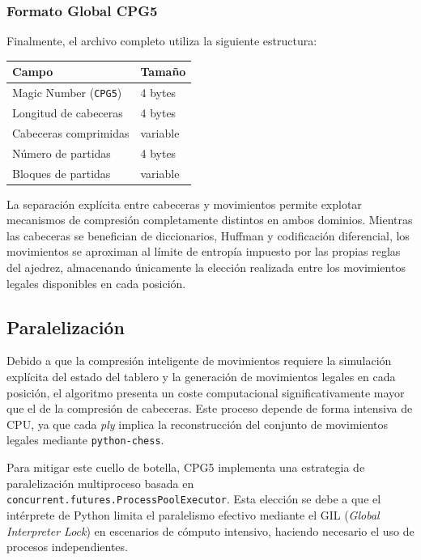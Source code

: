 \documentclass[11pt, letterpaper]{article}
\begin{document}
\subsubsection{Formato Global CPG5}

Finalmente, el archivo completo utiliza la siguiente estructura:

\begin{center}
\begin{tabular}{ll}
\hline
Campo & Tamaño \\
\hline
Magic Number (\texttt{CPG5}) & 4 bytes \\
Longitud de cabeceras & 4 bytes \\
Cabeceras comprimidas & variable \\
Número de partidas & 4 bytes \\
Bloques de partidas & variable \\
\hline
\end{tabular}
\end{center}

La separación explícita entre cabeceras y movimientos permite explotar mecanismos de compresión completamente distintos en ambos dominios. Mientras las cabeceras se benefician de diccionarios, Huffman y codificación diferencial, los movimientos se aproximan al límite de entropía impuesto por las propias reglas del ajedrez, almacenando únicamente la elección realizada entre los movimientos legales disponibles en cada posición.

\subsection{Paralelización}

Debido a que la compresión inteligente de movimientos requiere la simulación explícita del estado del tablero y la generación de movimientos legales en cada posición, el algoritmo presenta un coste computacional significativamente mayor que el de la compresión de cabeceras. Este proceso depende de forma intensiva de CPU, ya que cada \textit{ply} implica la reconstrucción del conjunto de movimientos legales mediante \texttt{python-chess}.

Para mitigar este cuello de botella, CPG5 implementa una estrategia de paralelización multiproceso basada en \texttt{concurrent.futures.ProcessPoolExecutor}. Esta elección se debe a que el intérprete de Python limita el paralelismo efectivo mediante el GIL (\textit{Global Interpreter Lock}) en escenarios de cómputo intensivo, haciendo necesario el uso de procesos independientes.
\end{document}
